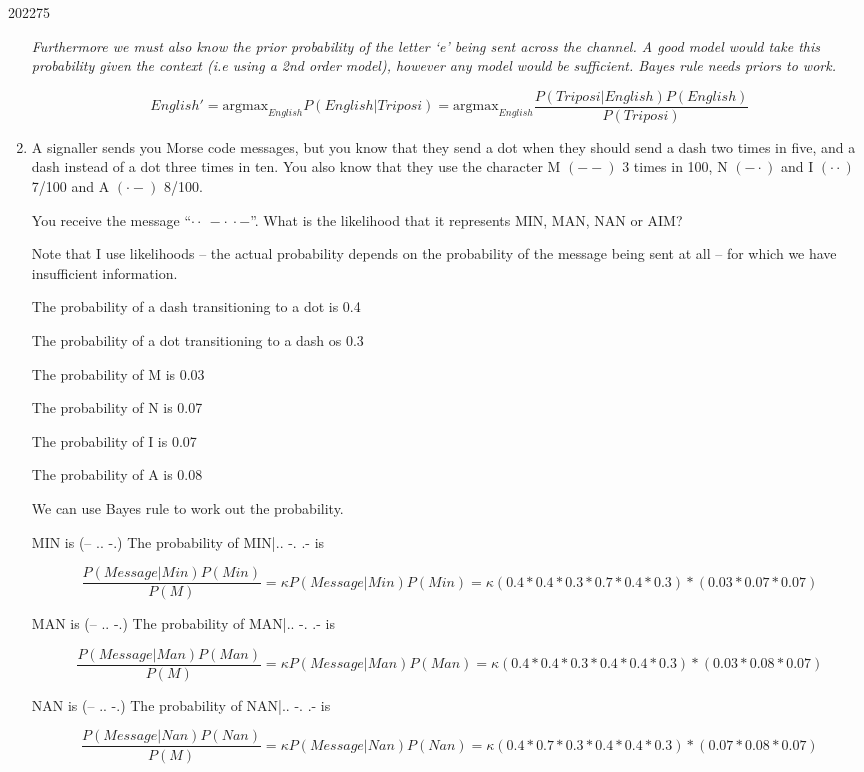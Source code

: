\documentclass[10pt,\jkfside,a4paper]{article}
\begin{document}
\begin{examquestion}{2022}{7}{5}
\begin{enumerate}
\textit{Furthermore we must also know the prior probability of the letter `e'
being sent across the channel. A good model would take this probability
given the context (i.e using a 2nd order model), however any model would be
sufficient. Bayes rule needs priors to work.}

\[
English' = \text{argmax}_{English} P(English|Triposi)
= \text{argmax}_{English} \frac{P(Triposi|English)P(English)}{P(Triposi)}
\]

\item A signaller sends you Morse code messages, but you know that they send
a dot when they should send a dash two times in five, and a dash instead of
a dot three times in ten. You also know that they use the character M $(--)$
3 times in 100, N $(-\cdot)$ and I $(\cdot\cdot)$ 7/100 and A
$(\cdot-)$ 8/100.

You receive the message ``$\cdot\cdot\ -\cdot\ \cdot-$''. What is the
likelihood that it represents MIN, MAN, NAN or AIM?

Note that I use likelihoods -- the actual probability depends on the
probability of the message being sent at all -- for which we have
insufficient information.

The probability of a dash transitioning to a dot is 0.4

The probability of a dot transitioning to a dash os 0.3

The probability of M is 0.03

The probability of N is 0.07

The probability of I is 0.07

The probability of A is 0.08

We can use Bayes rule to work out the probability.

MIN is (-- .. -.) The probability of MIN|.. -. .- is

\[
\frac{P(Message|Min)P(Min)}{P(M)}
= \kappa P(Message|Min)P(Min)
= \kappa (0.4 * 0.4 * 0.3 * 0.7 * 0.4 * 0.3) * (0.03 * 0.07 * 0.07)
\]

MAN is (-- .. -.) The probability of MAN|.. -. .- is

\[
\frac{P(Message|Man)P(Man)}{P(M)}
= \kappa P(Message|Man)P(Man)
= \kappa (0.4 * 0.4 * 0.3 * 0.4 * 0.4 * 0.3) * (0.03 * 0.08 * 0.07)
\]

NAN is (-- .. -.) The probability of NAN|.. -. .- is

\[
\frac{P(Message|Nan)P(Nan)}{P(M)}
= \kappa P(Message|Nan)P(Nan)
= \kappa (0.4 * 0.7 * 0.3 * 0.4 * 0.4 * 0.3) * (0.07 * 0.08 * 0.07)
\]


\end{enumerate}
\end{examquestion}
\end{document}
